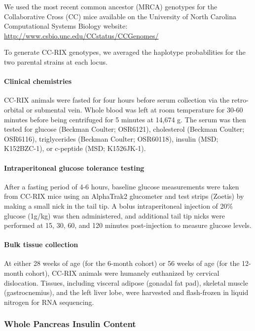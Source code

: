 \documentclass[
]{article}
\begin{document}
We used the most recent common ancestor (MRCA) genotypes for the
Collaborative Cross (CC) mice available on the University of North
Carolina Computational Systems Biology website:
\url{http://www.csbio.unc.edu/CCstatus/CCGenomes/}

To generate CC-RIX genotypes, we averaged the haplotype probabilities
for the two parental strains at each locus.

\paragraph{Clinical chemistries}\label{clinical-chemistries}

CC-RIX animals were fasted for four hours before serum collection via
the retro-orbital or submental vein. Whole blood was left at room
temperature for 30-60 minutes before being centrifuged for 5 minutes at
14,674 g. The serum was then tested for glucose (Beckman Coulter;
OSR6121), cholesterol (Beckman Coulter; OSR6116), triglycerides (Beckman
Coulter; OSR60118), insulin (MSD; K152BZC-1), or c-peptide (MSD;
K1526JK-1).

\paragraph{Intraperitoneal glucose tolerance
testing}\label{intraperitoneal-glucose-tolerance-testing}

After a fasting period of 4-6 hours, baseline glucose measurements were
taken from CC-RIX mice using an AlphaTrak2 glucometer and test strips
(Zoetis) by making a small nick in the tail tip. A bolus intraperitoneal
injection of 20\% glucose (1g/kg) was then administered, and additional
tail tip nicks were performed at 15, 30, 60, and 120 minutes
post-injection to measure glucose levels.

\paragraph{Bulk tissue collection}\label{bulk-tissue-collection}

At either 28 weeks of age (for the 6-month cohort) or 56 weeks of age
(for the 12-month cohort), CC-RIX animals were humanely euthanized by
cervical dislocation. Tissues, including visceral adipose (gonadal fat
pad), skeletal muscle (gastrocnemius), and the left liver lobe, were
harvested and flash-frozen in liquid nitrogen for RNA sequencing.

\subsubsection{Whole Pancreas Insulin
Content}\label{whole-pancreas-insulin-content}
\end{document}
